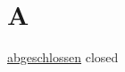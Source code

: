 \documentclass[a4paper,8pt,twocolumn]{extbook}
\begin{document}
\section{A}
\underline{abgeschlossen} closed
\end{document}
